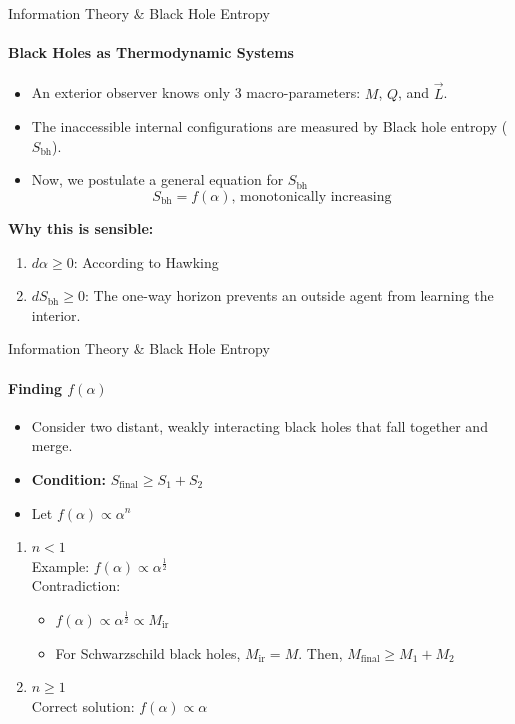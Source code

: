\documentclass[aspectratio=169]{beamer}
\begin{document}
\begin{frame}{Information Theory \& Black Hole Entropy}
\framesubtitle{Black Holes as Thermodynamic Systems}
    \begin{itemize}
        \item An exterior observer knows only 3 macro-parameters: $M$, $Q$, and $\vec{L}$.
        \item The inaccessible internal configurations are measured by Black hole entropy ($S_{\text{bh}}$).
        \item Now, we postulate a general equation for $S_{\text{bh}}$
          \begin{equation*}
            S_{\text{bh}} = f(\alpha) \text{, monotonically increasing}
          \end{equation*}
    \end{itemize}
    \textbf{Why this is sensible:}
    \begin{enumerate}
        \item $d\alpha \ge 0$: According to Hawking
        \item $dS_{\text{bh}} \ge 0$: The one-way horizon prevents an outside agent from learning the interior.
    \end{enumerate}
\end{frame}

\begin{frame}{Information Theory \& Black Hole Entropy}
\framesubtitle{Finding $f(\alpha)$}
  
  \begin{itemize}
    \item Consider two distant, weakly interacting black holes that fall together and merge.
    \item \textbf{Condition:} $S_{\text{final}} \ge S_1 + S_2$
    \item Let $f(\alpha) \propto \alpha^{n}$
  \end{itemize}
  \begin{enumerate}
        \item $n < 1$ \XSolidBrush \\
        Example: $f(\alpha) \propto \alpha^{\frac{1}{2}}$   \\
        Contradiction: 
        \begin{itemize}
            \item $f(\alpha) \propto \alpha^{\frac{1}{2}} \propto M_{\text{ir}}$
            \item For Schwarzschild black holes, $M_{\text{ir}} = M$. Then, $M_{\text{final}} \ge M_1 + M_2$
        \end{itemize}
        \item $n \ge 1$ \Checkmark \\
        Correct solution: $f(\alpha) \propto \alpha$ 
    \end{enumerate}
\end{frame}
\end{document}
